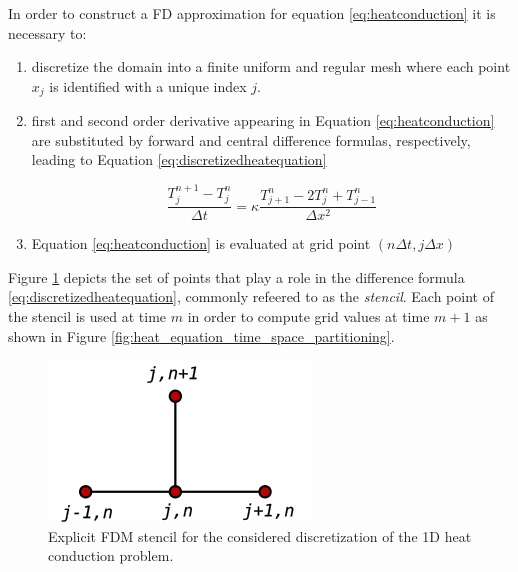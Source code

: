  In order to construct a FD approximation for equation \ref{eq:heatconduction} it is necessary to:  
 \begin{enumerate}
  
  \item discretize the domain into a finite uniform and regular mesh where each point $x_j$ is identified with a unique index $j$.
   
 \item  first and second order derivative appearing in Equation \ref{eq:heatconduction} are substituted by forward and central difference formulas, respectively, leading to Equation \ref{eq:discretizedheatequation} 
 
 \begin{equation}
  \frac{T^{n+1}_{j} - T^n_{j}}{\Delta t} = \kappa \frac{T^n_{j+1}- 2T^n_{j} + T^n_{j-1}}{\Delta x^2}
 \label{eq:discretizedheatequation}
 \end{equation}
 
 \item Equation \ref{eq:heatconduction} is evaluated at grid point $(n\Delta t, j \Delta x)$ 
    
\end{enumerate}    
Figure  \ref{fig:fdmheatequationstencil} depicts the set of points that play a role in the difference formula \ref{eq:discretizedheatequation}, commonly refeered to as the \textit{stencil}. Each point of the stencil is used at time $m$ in order to compute grid values at time $m+1$ as shown in Figure \ref{fig:heat_equation_time_space_partitioning}.
\begin{figure}[b]
  	\centering
  	\includegraphics[scale=0.5]{./images/CA_FDM/heatstencil}
  	\caption{Explicit FDM stencil for the considered discretization of the 1D heat conduction problem.}
   	\label{fig:fdmheatequationstencil}
\end{figure}   
